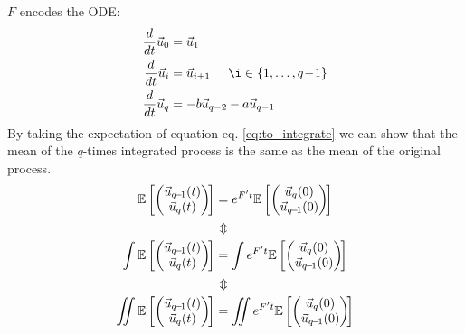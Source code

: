 {$F$ encodes the ODE:
\begin{align}
    \frac{d}{dt}\vec{u}_0 &= \vec{u}_1 \nonumber
    \\\frac{d}{dt}\vec{u}_i &= \vec{u}_{i+1} \hspace{5mm} \i \in \{1, \dots, q\!-\!1\}\label{eq:relationship}
    \\\frac{d}{dt}\vec{u}_q &= -b\vec{u}_{q-2} - a\vec{u}_{q-1}\label{eq:to_integrate}
\end{align}
By taking the expectation of equation eq. \ref{eq:to_integrate} we can show that the mean of the $q$-times integrated process is the same as the mean of the original process.
\begin{align*}
    \mathbb{E}\left[\begin{pmatrix}
        \vec{u}_{q\!-\!1}(t) \\ \vec{u}_{q}(t)
    \end{pmatrix} \!\right] &= 
    e^{F^\prime t} \mathbb{E}\left[\begin{pmatrix}
        \vec{u}_{q}(0) \\ \vec{u}_{q\!-\!1}(0)
    \end{pmatrix} \!\right]
    \\
    &\hspace*{2mm}\rotatebox[origin=c]{90}{$\Leftrightarrow$}
    \\
    \int \mathbb{E}\left[\begin{pmatrix}
        \vec{u}_{q\!-\!1}(t) \\ \vec{u}_{q}(t)
    \end{pmatrix} \!\right] &= \int 
    e^{F^\prime t} \mathbb{E}\left[\begin{pmatrix}
        \vec{u}_{q}(0) \\ \vec{u}_{q\!-\!1}(0)
    \end{pmatrix} \!\right]
    \\
    &\hspace*{2mm}\rotatebox[origin=c]{90}{$\Leftrightarrow$}
    \\
    \int\!\!\!\!\int \mathbb{E}\left[\begin{pmatrix}
        \vec{u}_{q\!-\!1}(t) \\ \vec{u}_{q}(t)
    \end{pmatrix} \!\right] &= \int\!\!\!\!\int 
    e^{F^\prime t} \mathbb{E}\left[\begin{pmatrix}
        \vec{u}_{q}(0) \\ \vec{u}_{q\!-\!1}(0)
    \end{pmatrix} \!\right]

\end{align*}}
